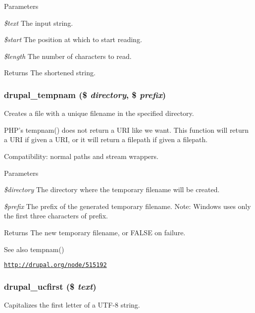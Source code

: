 \begin{DoxyParams}{Parameters}
\item[{\em \$text}]The input string. \item[{\em \$start}]The position at which to start reading. \item[{\em \$length}]The number of characters to read.\end{DoxyParams}
\begin{DoxyReturn}{Returns}
The shortened string. 
\end{DoxyReturn}
\hypertarget{group__php__wrappers_ga47b9f13fc4bed06501c52d1808de1661}{
\subsubsection[{drupal\_\-tempnam}]{\setlength{\rightskip}{0pt plus 5cm}drupal\_\-tempnam (\$ {\em directory}, \/  \$ {\em prefix})}}
\label{group__php__wrappers_ga47b9f13fc4bed06501c52d1808de1661}
Creates a file with a unique filename in the specified directory.

PHP's tempnam() does not return a URI like we want. This function will return a URI if given a URI, or it will return a filepath if given a filepath.

Compatibility: normal paths and stream wrappers.


\begin{DoxyParams}{Parameters}
\item[{\em \$directory}]The directory where the temporary filename will be created. \item[{\em \$prefix}]The prefix of the generated temporary filename. Note: Windows uses only the first three characters of prefix.\end{DoxyParams}
\begin{DoxyReturn}{Returns}
The new temporary filename, or FALSE on failure.
\end{DoxyReturn}
\begin{DoxySeeAlso}{See also}
tempnam() 

\href{http://drupal.org/node/515192}{\tt http://drupal.org/node/515192} 
\end{DoxySeeAlso}
\hypertarget{group__php__wrappers_ga15c15887a3e78bd69a50439373823517}{
\subsubsection[{drupal\_\-ucfirst}]{\setlength{\rightskip}{0pt plus 5cm}drupal\_\-ucfirst (\$ {\em text})}}
\label{group__php__wrappers_ga15c15887a3e78bd69a50439373823517}
Capitalizes the first letter of a UTF-\/8 string.


